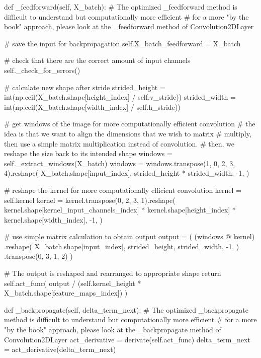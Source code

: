 \documentclass[%
oneside,                 %
final,                   %
10pt]{article}
\begin{document}
    def _feedforward(self, X_batch):
        # The optimized _feedforward method is difficult to understand but computationally more efficient
        # for a more "by the book" approach, please look at the _feedforward method of Convolution2DLayer

        # save the input for backpropagation
        self.X_batch_feedforward = X_batch

        # check that there are the correct amount of input channels
        self._check_for_errors()

        # calculate new shape after stride
        strided_height = int(np.ceil(X_batch.shape[height_index] / self.v_stride))
        strided_width = int(np.ceil(X_batch.shape[width_index] / self.h_stride))

        # get windows of the image for more computationally efficient convolution
        # the idea is that we want to align the dimensions that we wish to matrix
        # multiply, then use a simple matrix multiplication instead of convolution.
        # then, we reshape the size back to its intended shape
        windows = self._extract_windows(X_batch)
        windows = windows.transpose(1, 0, 2, 3, 4).reshape(
            X_batch.shape[input_index],
            strided_height * strided_width,
            -1,
        )

        # reshape the kernel for more computationally efficient convolution
        kernel = self.kernel
        kernel = kernel.transpose(0, 2, 3, 1).reshape(
            kernel.shape[kernel_input_channels_index]
            * kernel.shape[height_index]
            * kernel.shape[width_index],
            -1,
        )

        # use simple matrix calculation to obtain output
        output = (
            (windows @ kernel)
            .reshape(
                X_batch.shape[input_index],
                strided_height,
                strided_width,
                -1,
            )
            .transpose(0, 3, 1, 2)
        )

        # The output is reshaped and rearranged to appropriate shape
        return self.act_func(
            output / (self.kernel_height * X_batch.shape[feature_maps_index])
        )

    def _backpropagate(self, delta_term_next):
        # The optimized _backpropagate method is difficult to understand but computationally more efficient
        # for a more "by the book" approach, please look at the _backpropagate method of Convolution2DLayer
        act_derivative = derivate(self.act_func)
        delta_term_next = act_derivative(delta_term_next)
\end{document}
